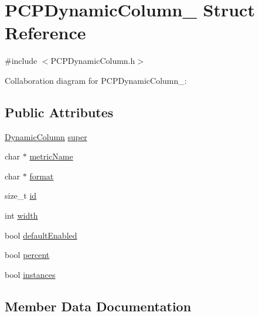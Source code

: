 \hypertarget{structPCPDynamicColumn__}{}\section{P\+C\+P\+Dynamic\+Column\+\_\+ Struct Reference}
\label{structPCPDynamicColumn__}


{\ttfamily \#include $<$P\+C\+P\+Dynamic\+Column.\+h$>$}



Collaboration diagram for P\+C\+P\+Dynamic\+Column\+\_\+\+:
\subsection*{Public Attributes}
\begin{DoxyCompactItemize}
\item 
\hyperlink{DynamicColumn_8h_ae58b8180abf67f1af86ba3d6976de501}{Dynamic\+Column} \hyperlink{structPCPDynamicColumn___a40bfe73b6c2828f5acdcc5b9962ec309}{super}
\item 
char $\ast$ \hyperlink{structPCPDynamicColumn___af9355ba178c746df7a91d19f107fbba0}{metric\+Name}
\item 
char $\ast$ \hyperlink{structPCPDynamicColumn___aefbe2099bc8648eff196288fc9323ee3}{format}
\item 
size\+\_\+t \hyperlink{structPCPDynamicColumn___aa30b4c8bd5966d5f27d0aee214af58d4}{id}
\item 
int \hyperlink{structPCPDynamicColumn___af622dfb7de7c3e7bebee8ae1fb68a319}{width}
\item 
bool \hyperlink{structPCPDynamicColumn___ad76c82d3f5e92ab413ff9219b6804625}{default\+Enabled}
\item 
bool \hyperlink{structPCPDynamicColumn___a9590f408cd6b0d3fe673c8315fad8d6d}{percent}
\item 
bool \hyperlink{structPCPDynamicColumn___a22c99f4640d7a26650c4a4de3f9ece32}{instances}
\end{DoxyCompactItemize}


\subsection{Member Data Documentation}
\mbox{\label{structPCPDynamicColumn___ad76c82d3f5e92ab413ff9219b6804625}} 
